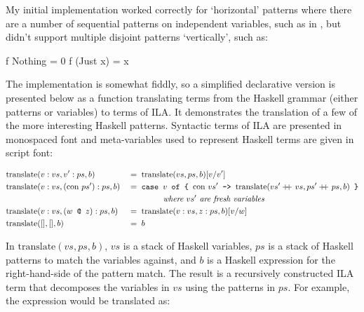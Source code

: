 \documentclass[dissertation.tex]{subfiles}
\begin{document}
{{{{                My initial implementation worked correctly for `horizontal' patterns where there are a number of
                sequential patterns on independent variables, such as in , but didn't
                support multiple disjoint patterns `vertically', such as:

                \begin{haskellfigure}
                f Nothing = 0
                f (Just x) = x
                \end{haskellfigure}
            
                The implementation is somewhat fiddly, so a simplified declarative version is presented below as a
                function translating terms from the Haskell grammar (either patterns or variables) to terms of ILA. It
                demonstrates the translation of a few of the more interesting Haskell patterns. Syntactic terms of ILA
                are presented in monospaced font and meta-variables used to represent Haskell terms are given in script
                font:

                \begin{alignat*}{2}
                \text{translate} & (v:vs, v':ps, b) && =\; \text{translate} (vs, ps, b) [v/v'] \\
                \text{translate} & (v:vs, (\text{con }ps'):ps, b) && =\; \texttt{case } v \texttt{ of \{ }\text{con
                }vs'\texttt{ -> } \text{translate} (vs' +\kern-1.3ex+\kern0.8ex vs, ps' +\kern-1.3ex+\kern0.8ex ps, b) \texttt{ \}} \\
                & && \hspace{1.5cm}\textit{where } vs' \textit{ are fresh variables} \\
                \text{translate} & (v:vs, (w \texttt{ @ } z):ps, b) && =\; \text{translate} (v:vs, z:ps, b) [v/w] \\
                \text{translate} & ([], [], b) && =\; b
                \end{alignat*}

                In \(\text{translate}(vs,ps,b)\), \(vs\) is a stack of Haskell variables, \(ps\) is a stack of Haskell
                patterns to match the variables against, and \(b\) is a Haskell expression for the right-hand-side of
                the pattern match. The result is a recursively constructed ILA term that decomposes the variables in
                \(vs\) using the patterns in \(ps\). For example, the expression  would be translated as:
            
}}}}
\end{document}
